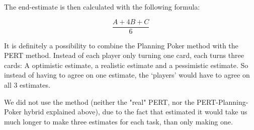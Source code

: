 The end-estimate is then calculated with the  following formula:

\begin{equation}
	\frac{A+4B+C}{6}
\end{equation}

It is definitely a possibility to combine the Planning Poker method with the PERT method. Instead of each player only turning one card, each turns three cards: A optimistic estimate, a realistic estimate and a pessimistic estimate. So instead of having to agree on one estimate, the `players' would have to agree on all 3 estimates.

We did not use the method (neither the "real" PERT, nor the PERT-Planning-Poker hybrid explained above), due to the fact that estimated it would take us much longer to make three estimates for each task, than only making one.